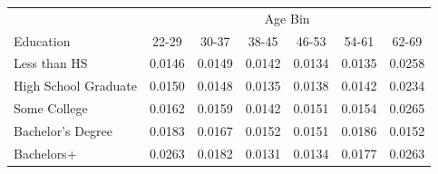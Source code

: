 \begin{tabular}{lcccccc}
\hline\hline
 & \multicolumn{6}{c}{Age Bin} \\
Education & 22-29 & 30-37 & 38-45 & 46-53 & 54-61 & 62-69 \\
\hline
Less than HS&0.0146&0.0149&0.0142&0.0134&0.0135&0.0258\\
High School Graduate&0.0150&0.0148&0.0135&0.0138&0.0142&0.0234\\
Some College&0.0162&0.0159&0.0142&0.0151&0.0154&0.0265\\
Bachelor's Degree&0.0183&0.0167&0.0152&0.0151&0.0186&0.0152\\
Bachelors+&0.0263&0.0182&0.0131&0.0134&0.0177&0.0263\\
\hline\hline
\end{tabular}
